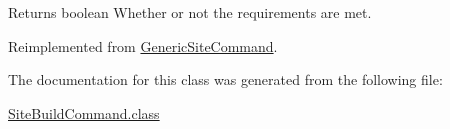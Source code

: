 \begin{DoxyReturn}{Returns}
boolean Whether or not the requirements are met. 
\end{DoxyReturn}


Reimplemented from \hyperlink{classGenericSiteCommand_a984e5d6fa123e9443f14d99a7919e85d}{Generic\-Site\-Command}.



The documentation for this class was generated from the following file\-:\begin{DoxyCompactItemize}
\item 
\hyperlink{SiteBuildCommand_8class}{Site\-Build\-Command.\-class}\end{DoxyCompactItemize}

